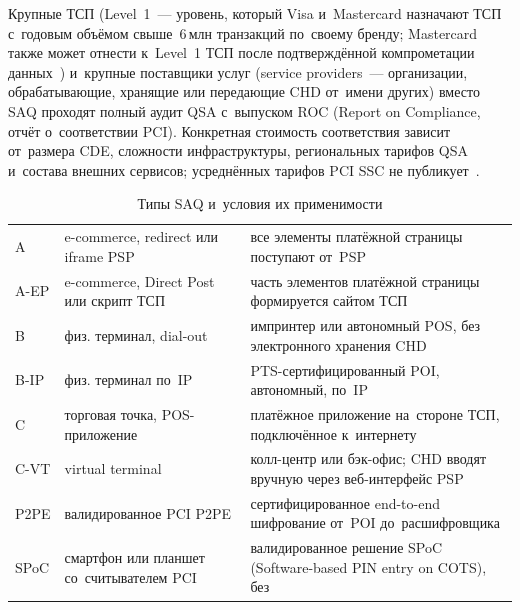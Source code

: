 Крупные ТСП (Level~1~--- уровень, который Visa и~Mastercard назначают
  ТСП с~годовым объёмом свыше~6\,млн транзакций по~своему бренду; Mastercard
  также может отнести к~Level~1 ТСП после подтверждённой компрометации
данных~\cite{visa-merchant-levels,mc-spme-2025}) и~крупные поставщики услуг
(service providers~--- организации, обрабатывающие, хранящие или передающие CHD
от~имени других) вместо SAQ проходят полный аудит QSA с~выпуском ROC (Report on Compliance, отчёт о~соответствии
PCI). Конкретная стоимость соответствия зависит от~размера CDE, сложности
инфраструктуры, региональных тарифов QSA и~состава внешних сервисов;
усреднённых тарифов PCI SSC не публикует~\cite{pci-dss-4}.

\begin{table}[tbp]
  \caption{Типы SAQ и~условия их применимости}\label{tab:pci-saq-decision}
  \begingroup
  \tablesetup
  \begin{minipage}{\textwidth}
    \begin{tabularx}{\textwidth}{@{}B{0.09\textwidth} P{0.26\textwidth} Y@{}}
      \toprule
      \headrow
       &  &  \\
      \midrule
      A & e-commerce, redirect или iframe PSP &
      все элементы платёжной страницы поступают от~PSP \\
      \rowsep
      A-EP & e-commerce, Direct Post или скрипт ТСП &
      часть элементов платёжной страницы формируется сайтом ТСП \\
      \rowsep
      B & физ. терминал, dial-out &
      импринтер или автономный POS, без электронного хранения CHD \\
      \rowsep
      B-IP & физ. терминал по~IP &
      PTS-сертифицированный POI, автономный, по~IP \\
      \rowsep
      C & торговая точка, POS-приложение &
      платёжное приложение на~стороне ТСП, подключённое к~интернету \\
      \rowsep
      C-VT & virtual terminal &
      колл-центр или бэк-офис; CHD вводят вручную через веб-интерфейс PSP \\
      \rowsep
      P2PE & валидированное PCI P2PE &
      сертифицированное end-to-end шифрование от~POI до~расшифровщика \\
      \rowsep
      SPoC & смартфон или планшет со~считывателем PCI &
      валидированное решение SPoC (Software-based PIN entry on COTS), без

\end{tabularx}
\end{minipage}
\end{table}
